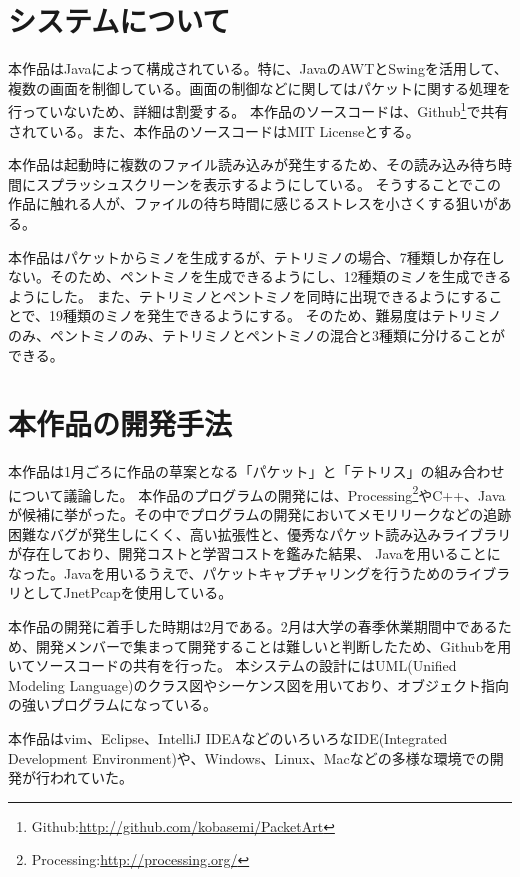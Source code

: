\documentclass[11pt,a4paper]{jsarticle}
\begin{document}
\section{システムについて}
本作品はJavaによって構成されている。特に、JavaのAWTとSwingを活用して、複数の画面を制御している。画面の制御などに関してはパケットに関する処理を行っていないため、詳細は割愛する。
本作品のソースコードは、Github\footnote{Github:\url{http://github.com/kobasemi/PacketArt}}で共有されている。また、本作品のソースコードはMIT Licenseとする。

本作品は起動時に複数のファイル読み込みが発生するため、その読み込み待ち時間にスプラッシュスクリーンを表示するようにしている。
そうすることでこの作品に触れる人が、ファイルの待ち時間に感じるストレスを小さくする狙いがある。

本作品はパケットからミノを生成するが、テトリミノの場合、7種類しか存在しない。そのため、ペントミノを生成できるようにし、12種類のミノを生成できるようにした。
また、テトリミノとペントミノを同時に出現できるようにすることで、19種類のミノを発生できるようにする。
そのため、難易度はテトリミノのみ、ペントミノのみ、テトリミノとペントミノの混合と3種類に分けることができる。

\section{本作品の開発手法}
本作品は1月ごろに作品の草案となる「パケット」と「テトリス」の組み合わせについて議論した。
本作品のプログラムの開発には、Processing\footnote{Processing:\url{http://processing.org/}}やC++、Javaが候補に挙がった。その中でプログラムの開発においてメモリリークなどの追跡困難なバグが発生しにくく、高い拡張性と、優秀なパケット読み込みライブラリが存在しており、開発コストと学習コストを鑑みた結果、
Javaを用いることになった。Javaを用いるうえで、パケットキャプチャリングを行うためのライブラリとしてJnetPcapを使用している。

本作品の開発に着手した時期は2月である。2月は大学の春季休業期間中であるため、開発メンバーで集まって開発することは難しいと判断したため、Githubを用いてソースコードの共有を行った。
本システムの設計にはUML(Unified Modeling Language)のクラス図やシーケンス図を用いており、オブジェクト指向の強いプログラムになっている。

本作品はvim、Eclipse、IntelliJ IDEAなどのいろいろなIDE(Integrated Development Environment)や、Windows、Linux、Macなどの多様な環境での開発が行われていた。

\begin{thebibliography}{99}
\end{thebibliography}
\end{document}
